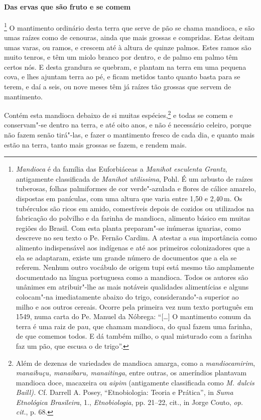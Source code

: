 \begin{linenumbers}
\paragraph{Das ervas que são fruto e se comem}\quad
{}\footnote{ \textit{Mandioca} é da família das
Euforbiáceas a \textit{Manihot esculenta Grantz}, antigamente
classificada de \textit{Manihot utilissima}, Pohl. É um arbusto de
raízes tuberosas, folhas palmiformes de cor verde"-azulada e flores de
cálice amarelo, dispostas em panículas, com uma altura que varia entre
1,50 e 2,40\,m. Os tubérculos são ricos em amido, comestíveis depois de
cozidos ou utilizados na fabricação do polvilho e da farinha de
mandioca, alimento básico em muitas regiões do Brasil. Com esta planta
preparam"-se inúmeras iguarias, como descreve no seu texto o Pe. Fernão
Cardim. A atestar a sua importância como alimento indispensável aos
indígenas e até aos primeiros colonizadores que a ela se adaptaram,
existe um grande número de documentos que a ela se referem. Nenhum 
outro vocábulo de origem tupi está mesmo tão amplamente documentado na
língua portuguesa como a mandioca. Todos os autores são unânimes em
atribuir"-lhe as mais notáveis qualidades alimentícias e alguns 
colocam"-na imediatamente abaixo do trigo, considerando"-a superior ao
milho e aos outros cereais. Ocorre pela primeira vez num texto
português em 1549, numa carta do Pe. Manuel da Nóbrega: ``[\ldots{}] 
O mantimento comum da terra é uma raiz de pau, que chamam
mandioca, do qual fazem uma farinha, de que comemos todos. E dá também
milho, o qual misturado com a farinha faz um pão, que escusa o de
trigo''.} O mantimento ordinário desta terra que serve de
pão se chama mandioca, e são umas raízes como de cenouras, ainda que
mais grossas e compridas. Estas deitam umas varas, ou ramos, e crescem
até à altura de quinze palmos. Estes ramos são muito tenros, e têm um
miolo branco por dentro, e de palmo em palmo têm certos nós. E desta
grandura se quebram, e plantam na terra em uma pequena cova, e lhes
ajuntam terra ao pé, e ficam metidos tanto quanto basta para se terem,
e daí a seis, ou nove meses têm já raízes tão grossas que servem de mantimento.

 Contém esta mandioca debaixo de si muitas espécies,\footnote{ Além de
dezenas de variedades de mandioca amarga, como a
\textit{mandiocamirim}, \textit{manaibuçu, manaibaru, manaitinga}, 
entre outras, os ameríndios plantavam mandioca doce, macaxeira ou
\textit{aipim} (antigamente classificada como \textit{M. dulcis Baill).} 
Cf. Darrell A. Posey, ``Etnobiologia: Teoria e Prática'', in
\textit{Suma Etnológica Brasileira}, 1., \textit{Etnobiologia}, 
pp. 21--22, cit., in Jorge Couto, \textit{op. cit.}, p. 68.} e todas se comem
e conservam"-se dentro na terra, e até oito anos, e não é necessário
celeiro, porque não fazem senão tirá"-las, e fazer o mantimento fresco
de cada dia, e quanto mais estão na terra, tanto mais grossas se fazem,
e rendem mais.


\end{linenumbers}
